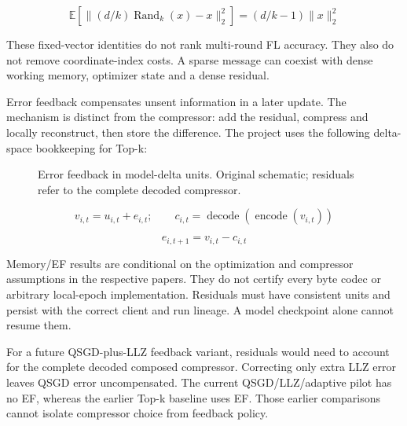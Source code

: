 \begin{equation*}\mathbb{E}[\|(d/k)\operatorname{Rand}_k(x)-x\|_2^2] = (d/k-1)\|x\|_2^2\end{equation*}

These fixed-vector identities do not rank multi-round FL accuracy. They also do not remove coordinate-index costs. A sparse message can coexist with dense working memory, optimizer state and a dense residual.

Error feedback compensates unsent information in a later update. The mechanism is distinct from the compressor: add the residual, compress and locally reconstruct, then store the difference. The project uses the following delta-space bookkeeping for Top-k:

\begin{figure}[htbp]\centering
{}
\caption{Error feedback in model-delta units. Original schematic; residuals refer to the complete decoded compressor.}
\label{fig:ef}
\end{figure}

\begin{equation*}v_{i,t}=u_{i,t}+e_{i,t};\qquad c_{i,t}=\operatorname{decode}(\operatorname{encode}(v_{i,t}))\end{equation*}

\begin{equation*}e_{i,t+1}=v_{i,t}-c_{i,t}\end{equation*}

Memory/EF results are conditional on the optimization and compressor assumptions in the respective papers. They do not certify every byte codec or arbitrary local-epoch implementation. Residuals must have consistent units and persist with the correct client and run lineage. A model checkpoint alone cannot resume them. \parencite{stich2018memory,karimireddy2019error}

For a future QSGD-plus-LLZ feedback variant, residuals would need to account for the complete decoded composed compressor. Correcting only extra LLZ error leaves QSGD error uncompensated. The current QSGD/LLZ/adaptive pilot has no EF, whereas the earlier Top-k baseline uses EF. Those earlier comparisons cannot isolate compressor choice from feedback policy.

